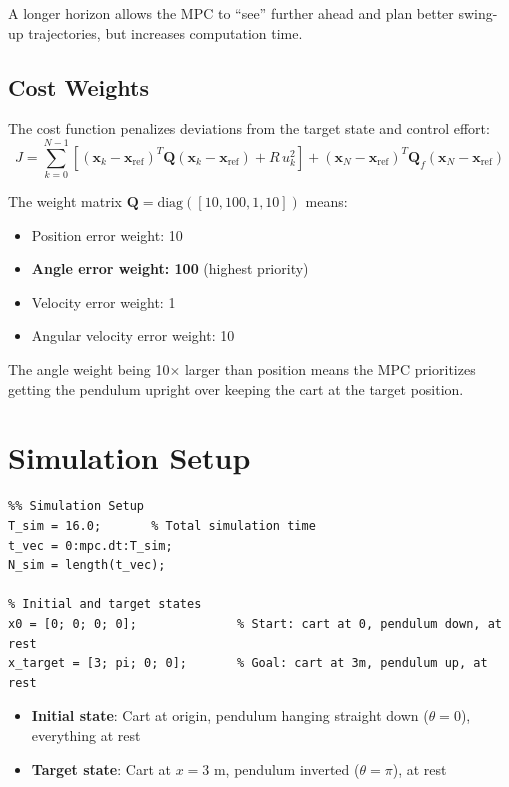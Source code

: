 \documentclass[11pt]{article}
\begin{document}
A longer horizon allows the MPC to ``see'' further ahead and plan better swing-up trajectories, but increases computation time.

\subsection{Cost Weights}

The cost function penalizes deviations from the target state and control effort:
\[
J = \sum_{k=0}^{N-1} \left[ (\mathbf{x}_k - \mathbf{x}_{\text{ref}})^T \mathbf{Q} (\mathbf{x}_k - \mathbf{x}_{\text{ref}}) + R \, u_k^2 \right] + (\mathbf{x}_N - \mathbf{x}_{\text{ref}})^T \mathbf{Q}_f (\mathbf{x}_N - \mathbf{x}_{\text{ref}})
\]

The weight matrix $\mathbf{Q} = \text{diag}([10, 100, 1, 10])$ means:
\begin{itemize}
    \item Position error weight: 10
    \item \textbf{Angle error weight: 100} (highest priority)
    \item Velocity error weight: 1
    \item Angular velocity error weight: 10
\end{itemize}

The angle weight being 10$\times$ larger than position means the MPC prioritizes getting the pendulum upright over keeping the cart at the target position.

\section{Simulation Setup}

\begin{lstlisting}
%% Simulation Setup
T_sim = 16.0;       % Total simulation time
t_vec = 0:mpc.dt:T_sim;
N_sim = length(t_vec);

% Initial and target states
x0 = [0; 0; 0; 0];              % Start: cart at 0, pendulum down, at rest
x_target = [3; pi; 0; 0];       % Goal: cart at 3m, pendulum up, at rest
\end{lstlisting}

\begin{itemize}
    \item \textbf{Initial state}: Cart at origin, pendulum hanging straight down ($\theta = 0$), everything at rest
    \item \textbf{Target state}: Cart at $x = 3$ m, pendulum inverted ($\theta = \pi$), at rest
\end{itemize}
\end{document}
